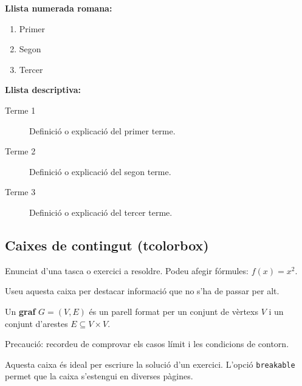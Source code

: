 \documentclass[informe, catalan]{practicaitic}
\theoremstyle{definition}
\theoremstyle{remark}
\begin{document}
\textbf{Llista numerada romana:}
\begin{enumerate}[label=\roman*.]
  \item Primer
  \item Segon
  \item Tercer
\end{enumerate}

\textbf{Llista descriptiva:}
\begin{description}
  \item[Terme 1] Definició o explicació del primer terme.
  \item[Terme 2] Definició o explicació del segon terme.
  \item[Terme 3] Definició o explicació del tercer terme.
\end{description}

\subsection{Caixes de contingut (tcolorbox)}

\begin{tcolorbox}[title=Tasca, colback=blue!5, colframe=myblue, fonttitle=\bfseries]
Enunciat d'una tasca o exercici a resoldre. Podeu afegir fórmules: $f(x) = x^2$.
\end{tcolorbox}

\vspace{0.4em}
\begin{tcolorbox}[title=Nota important, colback=yellow!10, colframe=orange!80!black, fonttitle=\bfseries]
Useu aquesta caixa per destacar informació que no s'ha de passar per alt.
\end{tcolorbox}

\vspace{0.4em}
\begin{tcolorbox}[title=Definició, colback=green!5, colframe=mygreen, fonttitle=\bfseries]
Un \textbf{graf} $G = (V, E)$ és un parell format per un conjunt de vèrtexs $V$
i un conjunt d'arestes $E \subseteq V \times V$.
\end{tcolorbox}

\vspace{0.4em}
\begin{tcolorbox}[title=Atenció, colback=red!5, colframe=myred, fonttitle=\bfseries]
Precaució: recordeu de comprovar els casos límit i les condicions de contorn.
\end{tcolorbox}

\vspace{0.4em}
\begin{tcolorbox}[title=Solució, colback=gray!5, colframe=gray!60, fonttitle=\bfseries,
  breakable]
Aquesta caixa és ideal per escriure la solució d'un exercici. L'opció
\texttt{breakable} permet que la caixa s'estengui en diverses pàgines.
\end{tcolorbox}
\end{document}
